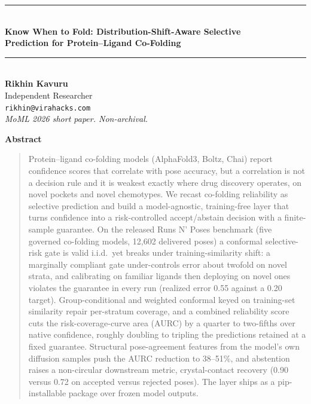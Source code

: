 \documentclass[10pt]{article}
\begin{document}
\begin{center}
{\vspace{-1.5em}\rule{\textwidth}{0.8pt}}\\[0.6em]
{\Large\bfseries Know When to Fold: Distribution-Shift-Aware Selective\\ Prediction for Protein--Ligand Co-Folding}\\[0.5em]
{\rule{\textwidth}{0.8pt}}\\[1.1em]
{\bfseries Rikhin Kavuru}\\[0.2em]
{\small Independent Researcher}\\
{\small\texttt{rikhin@virahacks.com}}\\[0.4em]
{\itshape\small MoML 2026 short paper. Non-archival.}
\end{center}
\thispagestyle{momlfirst}

\begin{center}\textbf{Abstract}\end{center}
\vspace{-0.3em}
\begin{quote}
Protein--ligand co-folding models (AlphaFold3, Boltz, Chai) report confidence scores that correlate
with pose accuracy, but a correlation is not a decision rule and it is weakest exactly where drug
discovery operates, on novel pockets and novel chemotypes. We recast co-folding reliability as
selective prediction and build a model-agnostic, training-free layer that turns confidence into a
risk-controlled accept/abstain decision with a finite-sample guarantee. On the released Runs N' Poses
benchmark (five governed co-folding models, 12{,}602 delivered poses) a conformal selective-risk gate
is valid i.i.d.\ yet breaks under training-similarity shift: a marginally compliant gate
under-controls error about twofold on novel strata, and calibrating on familiar ligands then
deploying on novel ones violates the guarantee in every run (realized error 0.55 against a 0.20
target). Group-conditional and weighted conformal keyed on training-set similarity repair per-stratum
coverage, and a combined reliability score cuts the risk-coverage-curve area (AURC) by a quarter to
two-fifths over native confidence, roughly doubling to tripling the predictions retained at a fixed
guarantee. Structural pose-agreement features from the model's own diffusion samples push the AURC
reduction to 38--51\%, and abstention raises a non-circular downstream metric, crystal-contact
recovery (0.90 versus 0.72 on accepted versus rejected poses). The layer ships as a pip-installable
package over frozen model outputs.
\end{quote}
\end{document}
